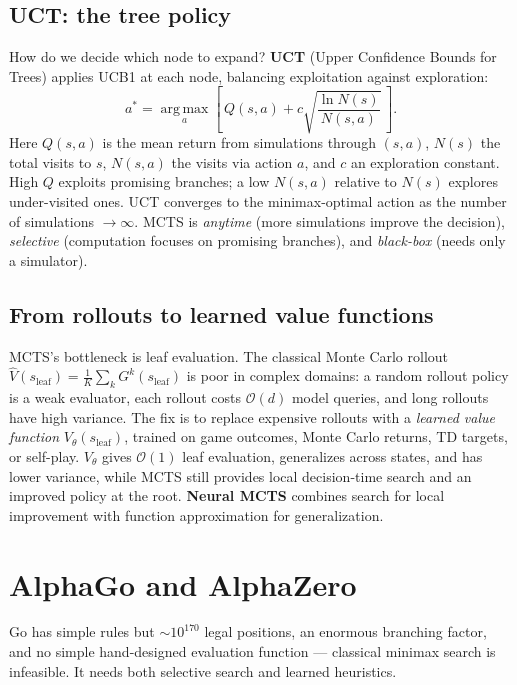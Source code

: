 \documentclass[11pt, oneside]{book}
\newcommand{\argmax}{\operatorname*{arg\,max}}
\newcommand{\bigO}[1]{\mathcal{O}\!\left(#1\right)}
\begin{document}
\subsection{UCT: the tree policy}

How do we decide which node to expand? \textbf{UCT} (Upper Confidence Bounds for Trees)
applies UCB1 at each node, balancing exploitation against exploration:
\[
  a^* = \argmax_a\!\left[\, Q(s,a) + c\sqrt{\frac{\ln N(s)}{N(s,a)}}\,\right].
\]
Here $Q(s,a)$ is the mean return from simulations through $(s,a)$, $N(s)$ the total visits
to $s$, $N(s,a)$ the visits via action $a$, and $c$ an exploration constant. High $Q$
exploits promising branches; a low $N(s,a)$ relative to $N(s)$ explores under-visited ones.
UCT converges to the minimax-optimal action as the number of simulations $\to \infty$.
MCTS is \emph{anytime} (more simulations improve the decision), \emph{selective} (computation
focuses on promising branches), and \emph{black-box} (needs only a simulator).

\subsection{From rollouts to learned value functions}

MCTS's bottleneck is leaf evaluation. The classical Monte Carlo rollout
$\hat V(s_{\text{leaf}}) = \tfrac{1}{K}\sum_k G^k(s_{\text{leaf}})$ is poor in complex
domains: a random rollout policy is a weak evaluator, each rollout costs $\bigO{d}$ model
queries, and long rollouts have high variance. The fix is to replace expensive rollouts
with a \emph{learned value function} $V_\theta(s_{\text{leaf}})$, trained on game outcomes,
Monte Carlo returns, TD targets, or self-play. $V_\theta$ gives $\bigO{1}$ leaf evaluation,
generalizes across states, and has lower variance, while MCTS still provides local
decision-time search and an improved policy at the root. \textbf{Neural MCTS} combines
search for local improvement with function approximation for generalization.

\section{AlphaGo and AlphaZero}

Go has simple rules but $\sim 10^{170}$ legal positions, an enormous branching factor, and
no simple hand-designed evaluation function --- classical minimax search is infeasible. It
needs both selective search and learned heuristics.
\end{document}
